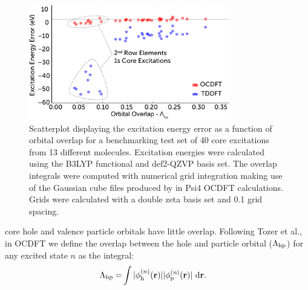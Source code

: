 \documentclass[12pt]{article}
\begin{document}
\begin{figure}[!t]
\centering
\includegraphics[width=8.8cm]{scatterNEWER2.pdf}
\caption{Scatterplot displaying the excitation energy error as a function of orbital overlap for a benchmarking test set of 40 core excitations from 13 different molecules. Excitation energies were calculated using the B3LYP functional and def2-QZVP basis set. The overlap integrals were computed with numerical grid integration making use of the Gaussian cube files produced by in Psi4 OCDFT calculations. Grids were calculated with a double zeta basis set and 0.1 grid spacing.}
\label{figure:scatter}
\end{figure}
core hole and valence particle orbitals have little overlap. Following Tozer et al.,\cite{peach_excitation_2008} in OCDFT we define the overlap between the hole and particle orbital ($\Lambda_{\rm hp}$) for any excited state $n$ as the integral:
\begin{align}
\Lambda_{\rm hp} = &\int |\phi^{(n)}_{\rm h} (\bf{r})||\phi^{(\textit{n})}_{\rm p} (\bf{r})| \ \rm d\bf{r}  .
\end{align}

\end{document}

